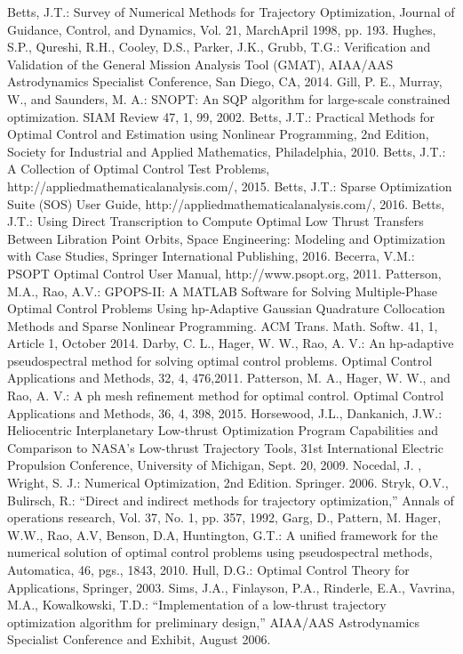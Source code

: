 \documentclass[ISTS  ]{tjsass} %
\begin{document}
\begin{thebibliography}{99}
Betts, J.T.: Survey of Numerical Methods for Trajectory Optimization, Journal of Guidance, Control, and Dynamics, Vol. 21, March\text{-}April 1998, pp. 193.
Hughes, S.P.,  Qureshi, R.H., Cooley, D.S., Parker, J.K., Grubb, T.G.: Verification and Validation of the General Mission Analysis Tool (GMAT),  AIAA/AAS Astrodynamics Specialist Conference, San Diego, CA, 2014.
Gill, P. E., Murray, W., and Saunders, M. A.: SNOPT: An SQP algorithm for large-scale constrained optimization. SIAM Review 47, 1, 99, 2002.
Betts, J.T.: Practical Methods for Optimal Control and Estimation using Nonlinear Programming, 2nd Edition, Society for Industrial and Applied Mathematics, Philadelphia, 2010.
Betts, J.T.: A Collection of Optimal Control Test Problems, http://appliedmathematicalanalysis.com/, 2015.
Betts, J.T.: Sparse Optimization Suite (SOS) User Guide, http://appliedmathematicalanalysis.com/, 2016.
Betts, J.T.: Using Direct Transcription to Compute Optimal Low Thrust Transfers Between Libration Point Orbits, Space Engineering: Modeling and Optimization with Case Studies, Springer International Publishing, 2016.
Becerra, V.M.: PSOPT Optimal Control User Manual, http://www.psopt.org, 2011.
Patterson, M.A., Rao, A.V.: GPOPS-II: A MATLAB Software for Solving Multiple-Phase Optimal Control Problems Using hp-Adaptive Gaussian Quadrature Collocation Methods and Sparse Nonlinear Programming. ACM Trans. Math. Softw. 41, 1, Article 1, October 2014.
Darby, C. L., Hager, W. W., Rao, A. V.: An hp-adaptive pseudospectral method for solving optimal control problems. Optimal Control Applications and Methods, 32, 4, 476,2011.
Patterson, M. A., Hager, W. W., and Rao, A. V.: A ph mesh refinement method for optimal control. Optimal Control Applications and Methods, 36, 4, 398, 2015.
Horsewood, J.L., Dankanich, J.W.: Heliocentric Interplanetary Low-thrust Optimization Program Capabilities and Comparison to NASA’s Low-thrust Trajectory Tools, 31st International Electric  Propulsion Conference, University of Michigan, Sept. 20, 2009.
Nocedal, J. , Wright, S. J.: Numerical Optimization, 2nd Edition. Springer. 2006.
Stryk, O.V., Bulirsch, R.: “Direct and indirect methods for trajectory optimization,” Annals of operations research, Vol. 37, No. 1, pp. 357, 1992,
Garg, D., Pattern, M. Hager, W.W., Rao, A.V, Benson, D.A, Huntington, G.T.: A unified framework for the numerical solution of optimal control problems using pseudospectral methods, Automatica,  46, pgs., 1843, 2010.
Hull, D.G.: Optimal Control Theory for Applications, Springer, 2003.
 Sims, J.A., Finlayson, P.A., Rinderle, E.A., Vavrina, M.A., Kowalkowski, T.D.: “Implementation of a low-thrust trajectory optimization algorithm for preliminary design,” AIAA/AAS Astrodynamics Specialist Conference and Exhibit, August 2006.
\end{thebibliography}
\end{document}
